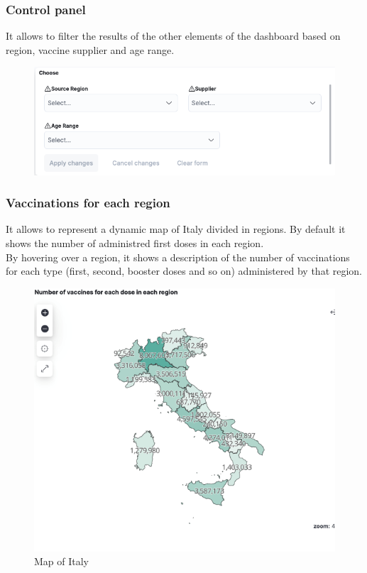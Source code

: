\documentclass[12pt, a4paper]{article}
\begin{document}
\subsubsection{Control panel}
It allows to filter the results of the other elements of the dashboard based on region,
vaccine supplier and age range.
\begin{figure}[ht]
  \centering
  \includegraphics[width=.9\linewidth]{img (2).png}
\end{figure}

\subsubsection{Vaccinations for each region}
It allows to represent a dynamic map of Italy divided in regions. By default it shows the
number of administred first doses in each region. \\ 
By hovering over a region, it shows a description of the number of vaccinations for each
type (first, second, booster doses and so on) administered by that region.

\begin{figure}[H]
  \centering
  \includegraphics[width=.8\linewidth]{img (4).png}
  \caption*{Map of Italy}
\end{figure}
\end{document}
